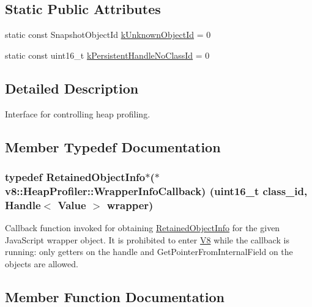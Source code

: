 \subsection*{Static Public Attributes}
\begin{DoxyCompactItemize}
\item 
static const Snapshot\+Object\+Id \hyperlink{classv8_1_1_heap_profiler_abf2b9d8facb18473f9b124ab8baf5786}{k\+Unknown\+Object\+Id} = 0
\item 
static const uint16\+\_\+t \hyperlink{classv8_1_1_heap_profiler_a272c9af3ea5cd90a2737af3d22a7eb78}{k\+Persistent\+Handle\+No\+Class\+Id} = 0
\end{DoxyCompactItemize}


\subsection{Detailed Description}
Interface for controlling heap profiling. 

\subsection{Member Typedef Documentation}
\hypertarget{classv8_1_1_heap_profiler_a696d8d6590879eeb5a4ad2814eafb599}{}
\subsubsection[{Wrapper\+Info\+Callback}]{\setlength{\rightskip}{0pt plus 5cm}typedef {\bf Retained\+Object\+Info}$\ast$($\ast$ v8\+::\+Heap\+Profiler\+::\+Wrapper\+Info\+Callback) (uint16\+\_\+t class\+\_\+id, {\bf Handle}$<$ {\bf Value} $>$ wrapper)}\label{classv8_1_1_heap_profiler_a696d8d6590879eeb5a4ad2814eafb599}
Callback function invoked for obtaining \hyperlink{classv8_1_1_retained_object_info}{Retained\+Object\+Info} for the given Java\+Script wrapper object. It is prohibited to enter \hyperlink{classv8_1_1_v8}{V8} while the callback is running\+: only getters on the handle and Get\+Pointer\+From\+Internal\+Field on the objects are allowed. 

\subsection{Member Function Documentation}
\hypertarget{classv8_1_1_heap_profiler_ae83d1fc891a24ecafdca44fca2dbe07a}{}
